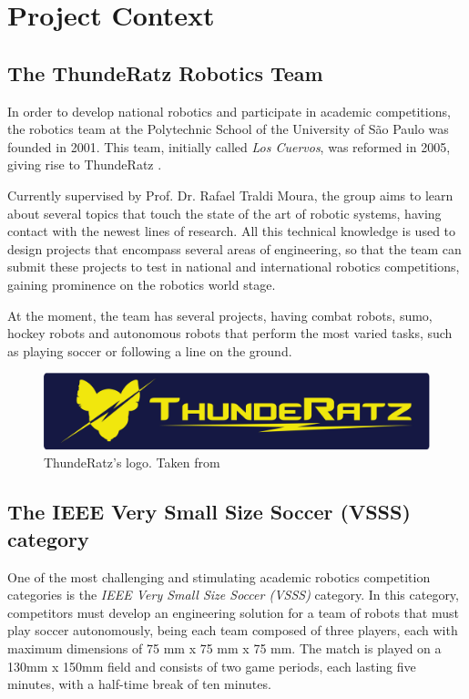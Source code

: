 \section{Project Context}

\subsection{The ThundeRatz Robotics Team}

In order to develop national robotics and participate in academic competitions, the robotics team at the Polytechnic School of the University of São Paulo was founded in 2001. This team, initially called \textit{Los Cuervos}, was reformed in 2005, giving rise to ThundeRatz \cite{ThundeRatz}.

Currently supervised by Prof. Dr. Rafael Traldi Moura, the group aims to learn about several topics that touch the state of the art of robotic systems, having contact with the newest lines of research. All this technical knowledge is used to design projects that encompass several areas of engineering, so that the team can submit these projects to test in national and international robotics competitions, gaining prominence on the robotics world stage.

At the moment, the team has several projects, having combat robots, sumo, hockey robots and autonomous robots that perform the most varied tasks, such as playing soccer or following a line on the ground.

\begin{figure}[!h]
    \centering
    \includegraphics[width=.6\linewidth]{chapters/introduction/images/ThundeRatz Logo.png}
    \caption{ThundeRatz's logo. Taken from \cite{ThundeRatz}}
\end{figure}

\subsection{The IEEE Very Small Size Soccer (VSSS) category}

One of the most challenging and stimulating academic robotics competition categories is the \textit{IEEE Very Small Size Soccer (VSSS)} category. In this category, competitors must develop an engineering solution for a team of robots that must play soccer autonomously, being each team composed of three players, each with maximum dimensions of 75 mm x 75 mm x 75 mm. The match is played on a 130mm x 150mm field and consists of two game periods, each lasting five minutes, with a half-time break of ten minutes.

